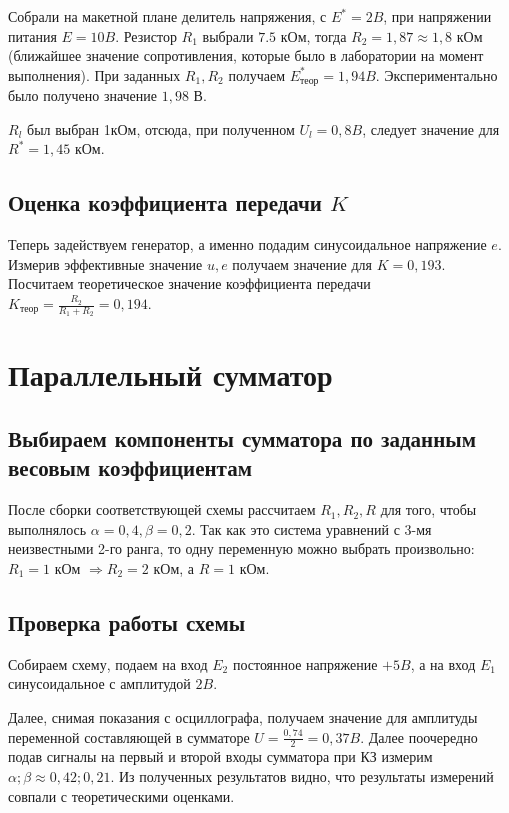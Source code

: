 \documentclass[a4paper, 12pt]{article}%
\begin{document}
Собрали на макетной плане делитель напряжения, с $E^{*} = 2 B$, при напряжении питания $E = 10 B$. Резистор $R_1$ выбрали $7.5 $ кОм, тогда $R_2 = 1,87 \approx 1,8$ кОм (ближайшее значение сопротивления, которые было в лаборатории на момент выполнения). При заданных $R_1, R_2$ получаем $E^{*}_{\text{теор}} = 1,94 B$. Экспериментально было получено значение $1,98$ В.

$R_l$ был выбран 1кОм, отсюда, при полученном $U_l = 0,8 B$, следует значение для $R^{*} = 1,45$ кОм.					
\subsection{Оценка коэффициента передачи $K$}

Теперь задействуем генератор, а именно подадим синусоидальное напряжение $e$. Измерив эффективные значение $u, e$ получаем значение для $K = 0,193$. Посчитаем теоретическое значение коэффициента передачи $K_{\text{теор}} = \frac{R_2}{R_1 + R_2} = 0,194$. 

\section{Параллельный сумматор}
									
\subsection{Выбираем компоненты сумматора по заданным весовым коэффициентам}

После сборки соответствующей схемы рассчитаем $R_1, R_2, R$ для того, чтобы выполнялось $\alpha = 0,4, \beta = 0,2$. Так как это система уравнений с 3-мя неизвестными 2-го ранга, то одну переменную можно выбрать 
произвольно: $R_1 = 1$ кОм $\Rightarrow R_2 = 2$ кОм, а $R = 1$ кОм. 					
					
\subsection{Проверка работы схемы}

Собираем схему, подаем на вход $E_2$ постоянное напряжение $+5 B$, а на вход $E_1$ синусоидальное с амплитудой $2 B$.

Далее, снимая показания с осциллографа, получаем значение для амплитуды переменной составляющей в сумматоре $U = \frac{0,74}{2} = 0,37 B$. Далее поочередно подав сигналы на первый и второй входы сумматора при КЗ измерим $\alpha; \beta \approx 0,42 ; 0,21$. Из полученных результатов видно, что результаты измерений совпали с теоретическими оценками.
\end{document}
